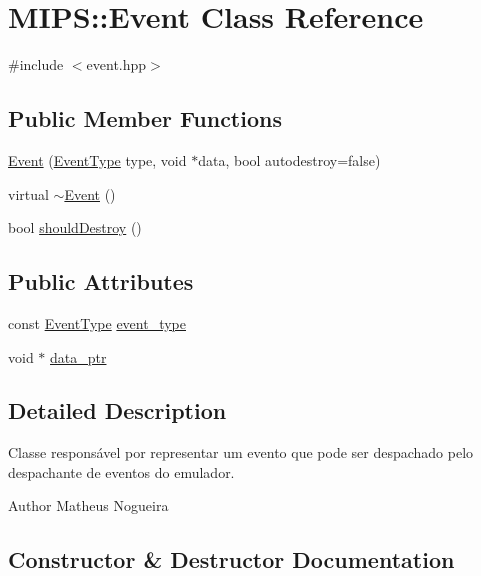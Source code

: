 \hypertarget{classMIPS_1_1Event}{}\section{M\+I\+PS\+:\+:Event Class Reference}
\label{classMIPS_1_1Event}


{\ttfamily \#include $<$event.\+hpp$>$}

\subsection*{Public Member Functions}
\begin{DoxyCompactItemize}
\item 
\hyperlink{classMIPS_1_1Event_a3c66c10469c0675dba66809fe92ba165}{Event} (\hyperlink{event_8hpp_a2b933d1ba3dc5a595db4dfa5b049c78c}{Event\+Type} type, void $\ast$data, bool autodestroy=false)
\item 
virtual \hyperlink{classMIPS_1_1Event_ae6a30dc2280feb5f1ec745cea46555f1}{$\sim$\+Event} ()
\item 
bool \hyperlink{classMIPS_1_1Event_a744dd00b534097bcd4d5db327a9da85a}{should\+Destroy} ()
\end{DoxyCompactItemize}
\subsection*{Public Attributes}
\begin{DoxyCompactItemize}
\item 
const \hyperlink{event_8hpp_a2b933d1ba3dc5a595db4dfa5b049c78c}{Event\+Type} \hyperlink{classMIPS_1_1Event_ab726d36d16847f2b2250394c6a462655}{event\+\_\+type}
\item 
void $\ast$ \hyperlink{classMIPS_1_1Event_a66f2b7a25dfb644ad5dc5b074f4b41a0}{data\+\_\+ptr}
\end{DoxyCompactItemize}


\subsection{Detailed Description}
Classe responsável por representar um evento que pode ser despachado pelo despachante de eventos do emulador.

\begin{DoxyAuthor}{Author}
Matheus Nogueira 
\end{DoxyAuthor}


\subsection{Constructor \& Destructor Documentation}
